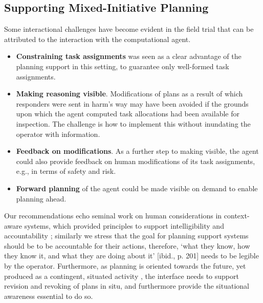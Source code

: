 \subsection{Supporting Mixed-Initiative Planning} 
Some interactional challenges have become evident in the field trial that can be attributed to the interaction with the computational agent.\\
\begin{itemize}
\item  \textbf{Constraining task assignments} was seen as a clear advantage of the planning support in this setting, to guarantee only well-formed task assignments.
\item \textbf{Making reasoning visible}. Modifications of plans as a result of which responders were sent in harm's way may have been avoided if the grounds upon which the agent computed task allocations had been available for inspection. The challenge is how to implement this without inundating the operator with information.
\item \textbf{Feedback on modifications}. As a further step to making visible, the agent could also provide feedback on human modifications of its task assignments, e.g., in terms of safety and risk.
\item \textbf{Forward planning} of the agent could be made visible on demand to enable planning ahead. 
\end{itemize}

Our recommendations echo seminal work on human considerations in context-aware systems, which provided principles to support intelligibility and accountability \cite{Bellotti2001}; similarly we stress that the goal for planning support systems should be  to be accountable for their actions, therefore, `what they know, how they know it, and what they are doing about it' [ibid., p. 201] needs to be legible by the operator. Furthermore, as planning is oriented towards the future, yet produced as a contingent, situated activity \cite{Suchman1987}, the interface needs to support revision and revoking of plans in situ, and furthermore provide the situational awareness essential to do so.  


